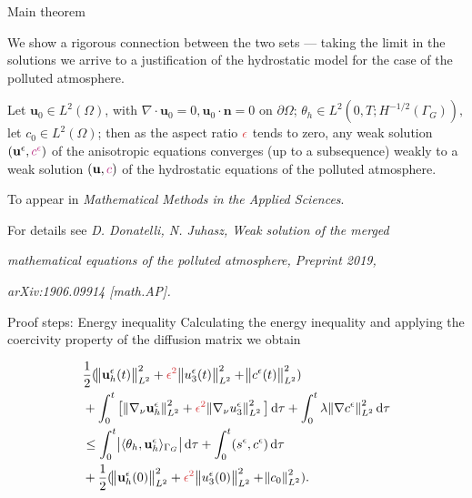 \documentclass{beamer}
\newcommand*\diff{\mathop{}\!\mathrm{d}}
\begin{document}
\begin{frame}{Main theorem}

We show a rigorous connection between the two sets --- taking the limit in the solutions we arrive to a justification of the hydrostatic model for the case of the polluted atmosphere.

\begin{theorem}
Let $\mathbf{u}_0 \in L^2 (\Omega)$, with $\nabla \cdot \mathbf{u}_0 = 0, \mathbf{u}_0 \cdot \mathbf{n} = 0$ on $\partial \Omega$; $\theta_h \in L^2(0,T; H^{-1/2}(\Gamma_G)),$ let $c_0 \in L^2 (\Omega)$; then as the aspect ratio $\textcolor{jasper}{\epsilon}$ tends to zero, any weak solution $(\mathbf{u}^\epsilon, \textcolor{mediumred-violet}{c^\epsilon})$ of the anisotropic equations converges (up to a subsequence) weakly to a weak solution $(\mathbf{u}, \textcolor{mediumred-violet}{c})$ of the hydrostatic equations of the polluted atmosphere.
\end{theorem}

\changefontsizes{10pt}
\hspace{3mm} To appear in \textit{Mathematical Methods in the Applied Sciences}.

\vspace{2mm}
\hspace{3mm} For details see \textit{D. Donatelli, N. Juhasz, Weak solution of the merged}

\hspace{3mm} \textit{mathematical equations of the polluted atmosphere, Preprint 2019,}

\hspace{3mm} \textit{arXiv:1906.09914 [math.AP].}
  
\end{frame}

\begin{frame}{Proof steps: Energy inequality}
Calculating the energy inequality and applying the coercivity property of the diffusion matrix we obtain

  \begin{equation} \nonumber
    \begin{split}  
    & \frac{1}{2} (\norm{\mathbf{u}_h^\epsilon (t)}_{L^2}^2 + \textcolor{jasper}{\epsilon^2} \norm{u_3^\epsilon (t)}_{L^2}^2 + \norm{c^\epsilon (t)}_{L^2}^2) \\
    & + \int_0 ^ t \big [\norm{\nabla_\nu \mathbf{u}_h^\epsilon}_{L^2}^2 + \textcolor{jasper}{\epsilon^2} \norm{\nabla_\nu u_3^\epsilon}_{L^2}^2 \big ] \diff \tau + \int_0 ^ t \lambda \norm{\nabla c^\epsilon}_{L^2}^2 \diff \tau \\
    & \leq \int_0^t \abs{\langle \theta_h, \mathbf{u}^\epsilon_h \rangle_{\Gamma_G}} \diff \tau + \int_0^t (s^\epsilon,c^\epsilon) \diff \tau \\
    & + \frac{1}{2} (\norm{\mathbf{u}_h^\epsilon (0)}_{L^2}^2 + \textcolor{jasper}{\epsilon^2} \norm{u_3^\epsilon (0)}_{L^2}^2 + \norm{c_0}_{L^2}^2).
    \end{split}
  \end{equation}
\end{frame}
\end{document}
